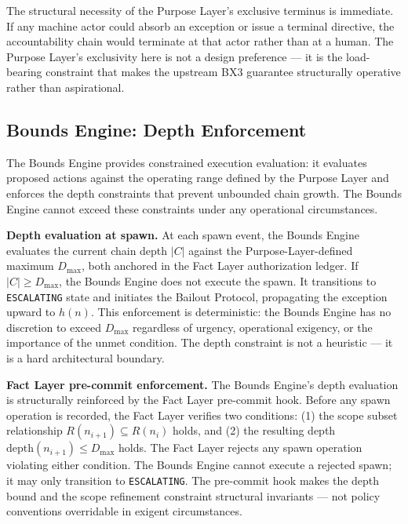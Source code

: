 The structural necessity of the Purpose Layer's exclusive terminus is immediate. If any machine actor could absorb an exception or issue a terminal directive, the accountability chain would terminate at that actor rather than at a human. The Purpose Layer's exclusivity here is not a design preference — it is the load-bearing constraint that makes the upstream BX3 guarantee structurally operative rather than aspirational.

\subsection{Bounds Engine: Depth Enforcement}
\label{sec:rs-bounds-depth}

The Bounds Engine provides constrained execution evaluation: it evaluates proposed actions against the operating range defined by the Purpose Layer and enforces the depth constraints that prevent unbounded chain growth. The Bounds Engine cannot exceed these constraints under any operational circumstances.

\medskip
\noindent\textbf{Depth evaluation at spawn.} At each spawn event, the Bounds Engine evaluates the current chain depth $|C|$ against the Purpose-Layer-defined maximum $D_{\mathrm{max}}$, both anchored in the Fact Layer authorization ledger. If $|C| \geq D_{\mathrm{max}}$, the Bounds Engine does not execute the spawn. It transitions to \texttt{ESCALATING} state and initiates the Bailout Protocol, propagating the exception upward to $h(n)$. This enforcement is deterministic: the Bounds Engine has no discretion to exceed $D_{\mathrm{max}}$ regardless of urgency, operational exigency, or the importance of the unmet condition. The depth constraint is not a heuristic — it is a hard architectural boundary.

\medskip
\noindent\textbf{Fact Layer pre-commit enforcement.} The Bounds Engine's depth evaluation is structurally reinforced by the Fact Layer pre-commit hook. Before any spawn operation is recorded, the Fact Layer verifies two conditions: (1) the scope subset relationship $R(n_{i+1}) \subseteq R(n_i)$ holds, and (2) the resulting depth $\mathrm{depth}(n_{i+1}) \leq D_{\mathrm{max}}$ holds. The Fact Layer rejects any spawn operation violating either condition. The Bounds Engine cannot execute a rejected spawn; it may only transition to \texttt{ESCALATING}. The pre-commit hook makes the depth bound and the scope refinement constraint structural invariants — not policy conventions overridable in exigent circumstances.

